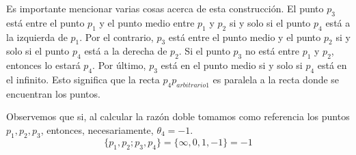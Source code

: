 Es importante mencionar varias cosas acerca de esta construcción. El punto $p_3$ está entre el punto $p_1$ y el punto medio entre $p_1$ y $p_2$ si y solo si el punto $p_4$ está a la izquierda de $p_1$. Por el contrario, $p_3$ está entre el punto medio y el punto $p_2$  si y solo si el punto $p_4$ está a la derecha de $p_2$. Si el punto $p_3$ no está entre $p_1$ y $p_2$, entonces lo estará $p_4$. Por último, $p_3$ está en el punto medio si y solo si $p_4$ está en el infinito. Esto significa que la recta $p_4p_{arbitrario1}$ es paralela a la recta donde se encuentran los puntos.

Observemos que si, al calcular la razón doble tomamos como referencia los puntos $p_1,p_2,p_3$, entonces, necesariamente, $\theta_4=-1$.
\begin{equation*}
	\{p_1,p_2;p_3,p_4\}=\{\infty,0,1,-1\}=-1
\end{equation*}

